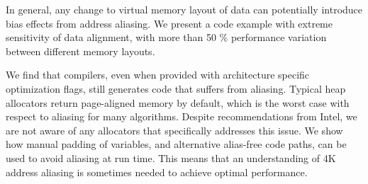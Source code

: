 \documentclass[a4paper,10pt,twocolumn,twoside]{article}
\begin{document}
In general, any change to virtual memory layout of data can potentially introduce bias effects from address aliasing. 
We present a code example with extreme sensitivity of data alignment, with more than 50 \% performance variation between different memory layouts.


We find that compilers, even when provided with architecture specific optimization flags, still generates code that suffers from aliasing. 
Typical heap allocators return page-aligned memory by default, which is the worst case with respect to aliasing for many algorithms.
Despite recommendations from Intel, we are not aware of any allocators that specifically addresses this issue. 
We show how manual padding of variables, and alternative alias-free code paths, can be used to avoid aliasing at run time.
This means that an understanding of 4K address aliasing is sometimes needed to achieve optimal performance. 





\end{document}
